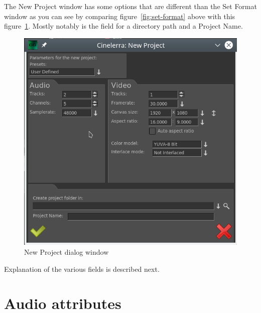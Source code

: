 The New Project window has some options that are different than the Set Format window as you can see by comparing figure~\ref{fig:set-format} above with this figure~\ref{fig:new-project}. 
Mostly notably is the field for a directory path and a Project Name.

\begin{figure}[htpb]
	\centering
	\includegraphics[width=0.5\linewidth]{images/new-project.png}
	\caption{New Project dialog window}
	\label{fig:new-project}
\end{figure}

Explanation of the various fields is described next.

\section{Audio attributes}%
\label{sec:audio_attributes}


